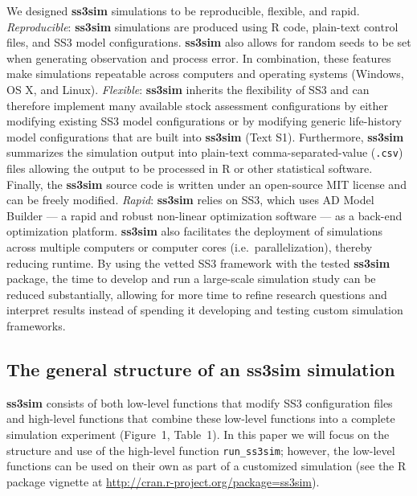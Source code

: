 \documentclass[10pt]{article}
\begin{document}
We designed \textbf{ss3sim} simulations to be reproducible,
flexible, and rapid. \emph{Reproducible}: \textbf{ss3sim} simulations are
produced using \textsf{R} code, plain-text control files, and SS3 model
configurations. \textbf{ss3sim} also allows for random seeds to be set when
generating observation and process error. In combination, these features make
simulations repeatable across computers and operating systems (Windows, OS X,
and Linux). \emph{Flexible}: \textbf{ss3sim} inherits the flexibility of SS3
and can therefore implement many available stock assessment configurations by
either modifying existing SS3 model configurations or by modifying generic
life-history model configurations that are built into \textbf{ss3sim} (Text
S1). Furthermore, \textbf{ss3sim} summarizes the simulation output into
plain-text comma-separated-value (\texttt{.csv}) files allowing the output to
be processed in \textsf{R} or other statistical software. Finally, the
\textbf{ss3sim} source code is written under an open-source MIT license and can
be freely modified. \emph{Rapid}: \textbf{ss3sim} relies on SS3, which uses AD
Model Builder \cite{fournier2012} --- a rapid and robust
non-linear optimization software \cite{bolker2013} --- as a back-end
optimization platform. \textbf{ss3sim} also facilitates the deployment of
simulations across multiple computers or computer cores (i.e.~parallelization),
thereby reducing runtime. By using the vetted SS3 framework with the
tested \textbf{ss3sim} package, the time to develop and run a large-scale
simulation study can be reduced substantially, allowing for more time to
refine research questions and interpret results instead of spending it
developing and testing custom simulation frameworks.

\subsection*{The general structure of an ss3sim simulation}

\textbf{ss3sim} consists of both low-level functions that modify SS3
configuration files and high-level functions that combine these low-level
functions into a complete simulation experiment (Figure~1, Table~1). In this
paper we will focus on the structure and use of the high-level function
\texttt{run\_ss3sim}; however, the low-level functions can be used on their own
as part of a customized simulation
(see the \textsf{R} package vignette at \url{http://cran.r-project.org/package=ss3sim}).
\end{document}
